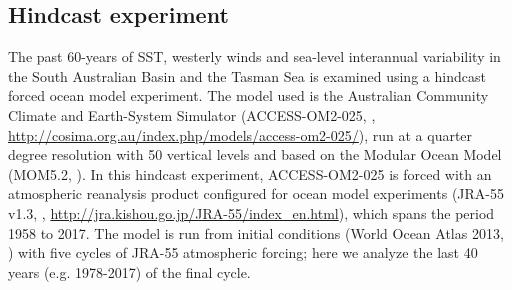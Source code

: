 \documentclass[draft,linenumbers]{agujournal2018}
\begin{document}
\subsection{Hindcast experiment}
The past 60-years of SST, westerly winds and sea-level interannual variability in the South Australian Basin and the Tasman Sea is examined using a hindcast forced ocean model experiment. The model used is the Australian Community Climate and Earth-System Simulator (ACCESS-OM2-025, \citealp{Bi2012,Kiss2019}, \url{http://cosima.org.au/index.php/models/access-om2-025/}), run at a quarter degree resolution with 50 vertical levels and based on the Modular Ocean Model (MOM5.2, \citealp{Griffies2012}). In this hindcast experiment, ACCESS-OM2-025 is forced with an atmospheric reanalysis product configured for ocean model experiments (JRA-55 v1.3, \citealp{Kobayashi2015}, \url{http://jra.kishou.go.jp/JRA-55/index_en.html}), which spans the period 1958 to 2017. The model is run from initial conditions (World Ocean Atlas 2013, \citealp{Boyer2013}) with five cycles of JRA-55 atmospheric forcing; here we analyze the last 40 years (e.g. 1978-2017) of the final cycle.
\end{document}
